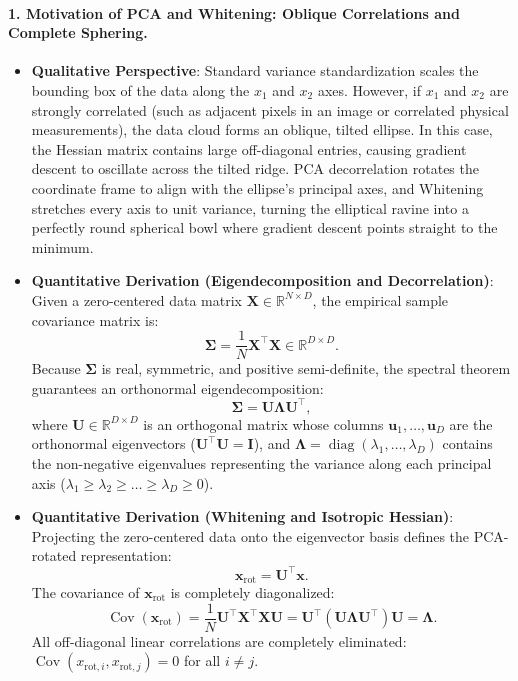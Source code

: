\paragraph{1. Motivation of PCA and Whitening: Oblique Correlations and Complete Sphering.}
\begin{itemize}[leftmargin=*]
  \item \textbf{Qualitative Perspective}: Standard variance standardization scales the bounding box of the data along the $x_1$ and $x_2$ axes. However, if $x_1$ and $x_2$ are strongly correlated (such as adjacent pixels in an image or correlated physical measurements), the data cloud forms an oblique, tilted ellipse. In this case, the Hessian matrix contains large off-diagonal entries, causing gradient descent to oscillate across the tilted ridge. PCA decorrelation rotates the coordinate frame to align with the ellipse's principal axes, and Whitening stretches every axis to unit variance, turning the elliptical ravine into a perfectly round spherical bowl where gradient descent points straight to the minimum.
  \item \textbf{Quantitative Derivation (Eigendecomposition and Decorrelation)}: Given a zero-centered data matrix $\mathbf{X} \in \mathbb{R}^{N \times D}$, the empirical sample covariance matrix is:
    \begin{equation}
    \boldsymbol{\Sigma} = \frac{1}{N} \mathbf{X}^\top \mathbf{X} \in \mathbb{R}^{D \times D}.
    \label{eq:covariance_matrix}
    \end{equation}
    Because $\boldsymbol{\Sigma}$ is real, symmetric, and positive semi-definite, the spectral theorem guarantees an orthonormal eigendecomposition:
    \begin{equation}
    \boldsymbol{\Sigma} = \mathbf{U} \boldsymbol{\Lambda} \mathbf{U}^\top,
    \end{equation}
    where $\mathbf{U} \in \mathbb{R}^{D \times D}$ is an orthogonal matrix whose columns $\mathbf{u}_1, \dots, \mathbf{u}_D$ are the orthonormal eigenvectors ($\mathbf{U}^\top \mathbf{U} = \mathbf{I}$), and $\boldsymbol{\Lambda} = \operatorname{diag}(\lambda_1, \dots, \lambda_D)$ contains the non-negative eigenvalues representing the variance along each principal axis ($\lambda_1 \ge \lambda_2 \ge \dots \ge \lambda_D \ge 0$).
  \item \textbf{Quantitative Derivation (Whitening and Isotropic Hessian)}:
    Projecting the zero-centered data onto the eigenvector basis defines the PCA-rotated representation:
    \begin{equation}
    \mathbf{x}_{\text{rot}} = \mathbf{U}^\top \mathbf{x}.
    \label{eq:pca_projection}
    \end{equation}
    The covariance of $\mathbf{x}_{\text{rot}}$ is completely diagonalized:
    \begin{equation}
    \operatorname{Cov}(\mathbf{x}_{\text{rot}}) = \frac{1}{N} \mathbf{U}^\top \mathbf{X}^\top \mathbf{X} \mathbf{U} = \mathbf{U}^\top (\mathbf{U} \boldsymbol{\Lambda} \mathbf{U}^\top) \mathbf{U} = \boldsymbol{\Lambda}.
    \end{equation}
    All off-diagonal linear correlations are completely eliminated: $\operatorname{Cov}(x_{\text{rot}, i}, x_{\text{rot}, j}) = 0$ for all $i \ne j$.
    

\end{itemize}
